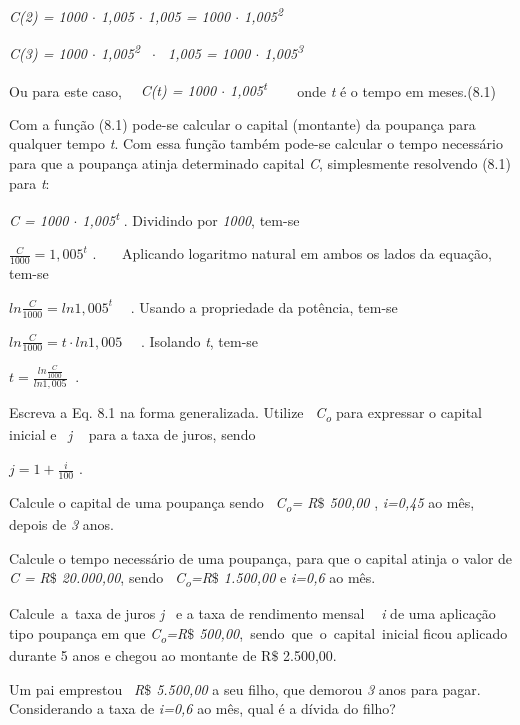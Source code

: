 \textit{C(2) = 1000 $ \cdot $  1,005 $ \cdot $  1,005 = 1000 $ \cdot $  1,005\textsuperscript{2}}

\textit{C(3) = 1000 $ \cdot $  1,005\textsuperscript{2}~ $ \cdot $ ~1,005 =  1000 $ \cdot $  1,005\textsuperscript{3}}

Ou para este caso,~~ \textit{C(t) = 1000 $ \cdot $  1,005\textsuperscript{t}} ~~~ onde \textit{t} é o tempo em meses.\quad (8.1)

Com a função (8.1) pode-se calcular o capital (montante) da poupança para qualquer tempo \textit{t}. Com essa função também pode-se calcular o tempo necessário para que a poupança atinja determinado capital \textit{C}, simplesmente resolvendo (8.1) para \textit{t}:

\textit{C = 1000 $ \cdot $  1,005\textsuperscript{t}} . Dividindo por \textit{1000}, tem-se

\( \frac{C}{1000}=1,005^{t} \) .~~~ Aplicando logaritmo natural em ambos os lados da equação, tem-se

\( ln\frac{C}{1000}=ln1,005^{t}~~~~ ^{} \) . Usando a propriedade da potência, tem-se

\( ln\frac{C}{1000}=t \cdot ln1,005^{}~~~~ ^{} \) . Isolando \textit{t}, tem-se

\( t=\frac{ln\frac{C}{1000}}{ln1,005}~  \) . \qedsymbol{}

\begin{exercicios}
    \exitem{} Escreva a Eq. 8.1 na forma generalizada. Utilize~ \textit{C\textsubscript{o}} para expressar o capital inicial e~  \textit{j} ~ para a taxa de juros, sendo

    \( j=1+\frac{i}{100} \) .

	\exitem{} Calcule o capital de uma poupança sendo~ \textit{C\textsubscript{o}= R$\$$  500,00 },\textit{ i=0,45 }ao mês, depois de \textit{3 }anos.~~ 

	\exitem{} Calcule o tempo necessário de uma poupança, para que o capital atinja o valor de \textit{C =} \textit{R$\$$  20.000,00}, sendo~ \textit{C\textsubscript{o}=R$\$$  1.500,00 } e\textit{ i=0,6 }ao mês.~ 

	\exitem{} Calcule~a~taxa de juros   \textit{j}~ e a taxa de rendimento mensal \textit{~ i } de uma aplicação tipo poupança em que \textit{C\textsubscript{o}=R$\$$  500,00},~sendo~que~o~capital~inicial ficou aplicado durante 5 anos e chegou ao montante de R$\$$   2.500,00.     

	\exitem{} Um pai emprestou~ \textit{R$\$$  5.500,00} a seu filho, que demorou \textit{3} anos para pagar. Considerando a taxa de\textit{ i=0,6 }ao mês, qual é a dívida do filho?~~ 

\end{exercicios}


